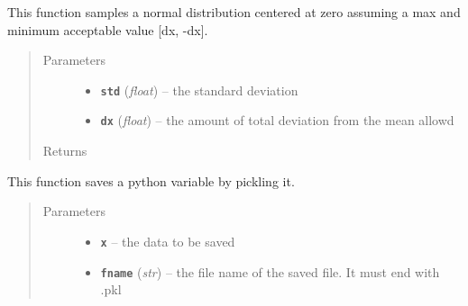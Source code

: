\documentclass[letterpaper,10pt,english]{sphinxmanual}
\begin{document}
\begin{fulllineitems}
\label{my_globals:my_globals.sample_normal}
This function samples a normal distribution centered at zero assuming a max and minimum acceptable value {[}dx, -dx{]}.
\begin{quote}\begin{description}
\item[{Parameters}] \leavevmode\begin{itemize}
\item {} 
\textbf{\texttt{std}} (\emph{float}) -- the standard deviation

\item {} 
\textbf{\texttt{dx}} (\emph{float}) -- the amount of total deviation from the mean allowd

\end{itemize}

\item[{Returns}] \leavevmode


\end{description}\end{quote}

\end{fulllineitems}


\begin{fulllineitems}
\label{my_globals:my_globals.save}
This function saves a python variable by pickling it.
\begin{quote}\begin{description}
\item[{Parameters}] \leavevmode\begin{itemize}
\item {} 
\textbf{\texttt{x}} -- the data to be saved

\item {} 
\textbf{\texttt{fname}} (\emph{str}) -- the file name of the saved file. It must end with .pkl

\end{itemize}

\end{description}\end{quote}

\end{fulllineitems}

\end{document}

